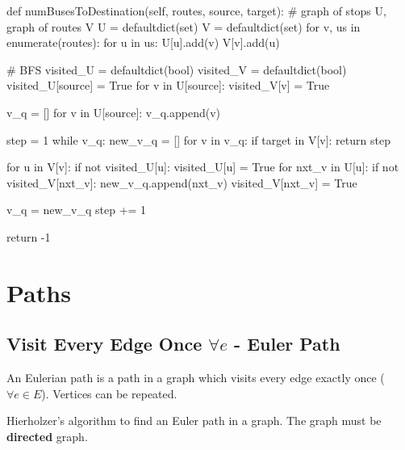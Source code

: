 \begin{python}
def numBusesToDestination(self, routes, source, target):
  # graph of stops U, graph of routes V
  U = defaultdict(set)
  V = defaultdict(set)
  for v, us in enumerate(routes):
    for u in us:
      U[u].add(v)
      V[v].add(u)

  # BFS
  visited_U = defaultdict(bool)
  visited_V = defaultdict(bool)
  visited_U[source] = True
  for v in U[source]:
    visited_V[v] = True

  v_q = []
  for v in U[source]:
    v_q.append(v)

  step = 1
  while v_q:
    new_v_q = []
    for v in v_q:
      if target in V[v]:
        return step

      for u in V[v]:
        if not visited_U[u]:
          visited_U[u] = True
          for nxt_v in U[u]:
            if not visited_V[nxt_v]:
              new_v_q.append(nxt_v)
              visited_V[nxt_v] = True

    v_q = new_v_q
    step += 1

  return -1
\end{python}
\section{Paths}
\subsection{Visit Every Edge Once $\forall e$ - Euler Path} 
An Eulerian path is a path in a graph which visits every edge exactly once ($\forall e \in E$). Vertices can be repeated.

Hierholzer's algorithm to find an Euler path in a graph. The graph must be \textbf{directed} graph.

